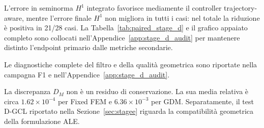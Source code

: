 L'errore in seminorma $H^1$ integrato favorisce mediamente il controller trajectory-aware, mentre l'errore finale $H^1$ non migliora in tutti i casi: nel totale la riduzione è positiva in 21/28 casi. La Tabella~\ref{tab:paired_stage_d} e il grafico appaiato completo sono collocati nell'Appendice~\ref{app:stage_d_audit} per mantenere distinto l'endpoint primario dalle metriche secondarie.

Le diagnostiche complete del filtro e della qualità geometrica sono riportate nella campagna F1 e nell'Appendice~\ref{app:stage_d_audit}.

La discrepanza $D_M$ non è un residuo di conservazione. La sua media relativa è circa $1.62\times10^{-4}$ per Fixed FEM e $6.36\times10^{-3}$ per GDM. Separatamente, il test D-GCL riportato nella Sezione~\ref{sec:stagee} riguarda la compatibilità geometrica della formulazione ALE.

